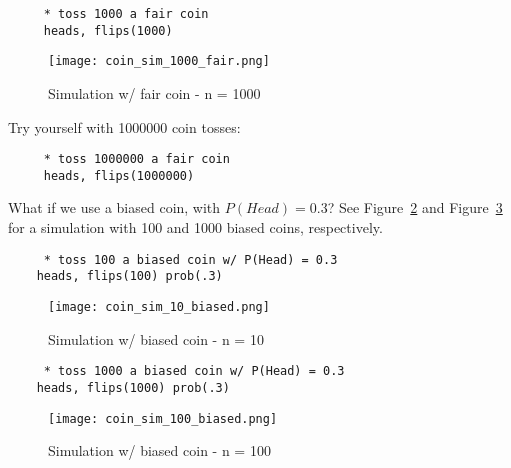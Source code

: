 \documentclass[11pt]{article}
\begin{document}
	\begin{verbatim}
	 * toss 1000 a fair coin
	 heads, flips(1000)
	\end{verbatim}


\begin{figure}[htp]
\centering
\texttt{[image: coin\_sim\_1000\_fair.png]}
\caption{Simulation w/ fair coin - n = 1000}
\label{f3}
\end{figure}
	
	 
Try yourself with 1000000 coin tosses:
	 
	\begin{verbatim}
	 * toss 1000000 a fair coin
	 heads, flips(1000000)
	\end{verbatim}
	


	What if we use a biased coin, with $P(Head) = 0.3$? See Figure~\ref{f4} and Figure~\ref{f5} for a simulation with 100 and 1000 biased coins, respectively.\\

	\begin{verbatim}
	 * toss 100 a biased coin w/ P(Head) = 0.3
	heads, flips(100) prob(.3)	 
	\end{verbatim}

\begin{figure}[htp]
\centering
\texttt{[image: coin\_sim\_10\_biased.png]}
\caption{Simulation w/ biased coin - n = 10}
\label{f4}
\end{figure}
	
	\begin{verbatim}
	 * toss 1000 a biased coin w/ P(Head) = 0.3
	heads, flips(1000) prob(.3)	 
	\end{verbatim}


\begin{figure}[htp]
\centering
\texttt{[image: coin\_sim\_100\_biased.png]}
\caption{Simulation w/ biased coin - n = 100}
\label{f5}
\end{figure}
\end{document}
